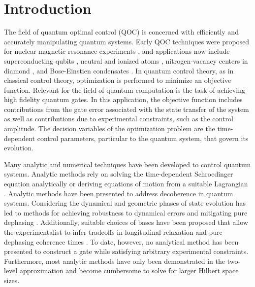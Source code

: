 \documentclass[
  amsfonts,
  amsmath,
  tbtags,
  amssymb,
  aps,
  nobibnotes,
  twocolumn,
  superscriptaddress,
]{revtex4-2}
\begin{document}
\section{Introduction}
The field of quantum optimal control (QOC) is concerned
with efficiently and accurately manipulating quantum systems.
Early QOC techniques were proposed for nuclear magnetic resonance experiments
\cite{khaneja2005optimal}, and applications now include superconducting
qubits \cite{heeres2017implementing,
  leng2019robust, leung2017speedup, xu2020nonadiabatic},
neutral and ionized atoms \cite{van2016optimal}, nitrogen-vacancy centers in
diamond \cite{rembold2020introduction}, and Bose-Einstien condensates
\cite{sorensen2018quantum}.
In quantum control theory, as in classical control theory,
optimization is performed
to minimize an objective function. Relevant for the field
of quantum computation is the task of achieving high fidelity quantum gates.
In this application, the objective function includes contributions from the
gate error associated with the state transfer of the system as well as contributions
due to experimental constraints, such as the control amplitude.
The decision variables of the optimization problem are the time-dependent control
parameters, particular to the quantum system, that govern its evolution.

Many analytic and numerical techniques have been developed to control
quantum systems. Analytic methods rely on solving the time-dependent
Schroedinger equation analytically or deriving equations of motion
from a suitable Lagrangian \cite{zhang2020universal, huang2020engineering, han2020experimental,
  xu2020nonadiabatic, carlini2005quantum}. Analytic methods
have been presented to address decoherence in quantum systems.
Considering the dynamical and geometric phases of state
evolution has led to methods for achieving
robustness to dynamical errors and mitigating pure dephasing
\cite{xu2020nonadiabatic, han2020experimental, merrill2014progress}.
Additionally, suitable choices of bases have been proposed that
allow the experimentalist to infer tradeoffs in longitudinal relaxation
and pure dephasing coherence times \cite{huang2020engineering}.
To date, however, no analytical method has been presented
to construct a gate while satisfying arbitrary experimental
constraints. Furthermore, most analytic methods have only
been demonstrated in the two-level approximation and become
cumbersome to solve for larger Hilbert space sizes.
\end{document}
